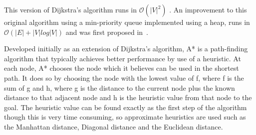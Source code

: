 This version of Dijkstra's algorithm runs in $\mathcal{O}(|V|^{2})$
\cite{xu2007improved}. An improvement to this original algorithm using a
min-priority queue implemented using a heap, runs in $\mathcal{O}
(|E| + |V|log |V|)$ and was first proposed in~\cite{fredman1987fibonacci}.


Developed initially as an extension of Dijkstra's algorithm, A* is a
path-finding algorithm that typically achieves better performance by
use of a heuristic. At each node, A* chooses the node which it believes
can be used in the shortest path. It does so by choosing the node with
the lowest value of f, where f is the sum of g and h, where g is the
distance to the current node plus the known distance to that adjacent
node and h is the heuristic value from that node to the goal. The heuristic
value can be found exactly as the first step of the algorithm though
this is very time consuming, so approximate heuristics are used such
as the Manhattan distance, Diagonal distance and the Euclidean distance.
